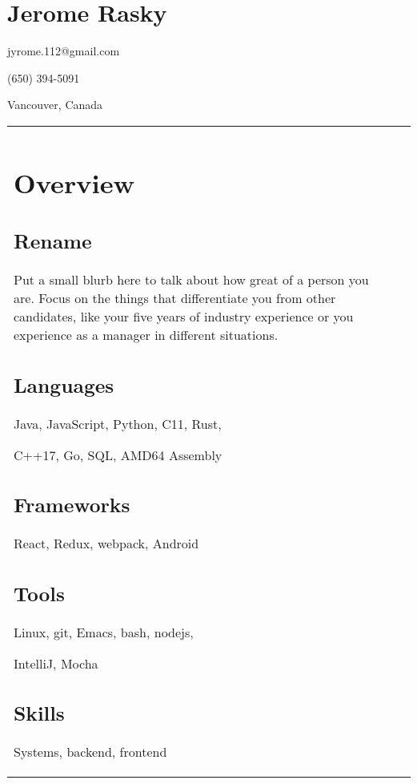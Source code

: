 \documentclass[letterpaper]{article}
\newlength{\leftcol}
\newlength{\rightcol}
\begin{document}
\bodyfont
\large
{}

\section*{\Huge\bfseries Jerome Rasky}

jyrome.112@gmail.com

(650) 394-5091

Vancouver, Canada

\begin{tabularx}{\textwidth}{@{}p{\leftcol} p{\rightcol}}
\vspace*{1pt}
\section*{Overview}
\subsection*{Rename}

Put a small blurb here to talk about how great of a person you are. Focus on the
things that differentiate you from other candidates, like your five years of
industry experience or you experience as a manager in different situations.

\subsection*{Languages}

Java, JavaScript, Python, C11, Rust,

C++17, Go, SQL, AMD64 Assembly

\subsection*{Frameworks}

React, Redux, webpack, Android

\subsection*{Tools}

Linux, git, Emacs, bash, nodejs,

IntelliJ, Mocha

\subsection*{Skills}

Systems, backend, frontend


\end{tabularx}
\end{document}
